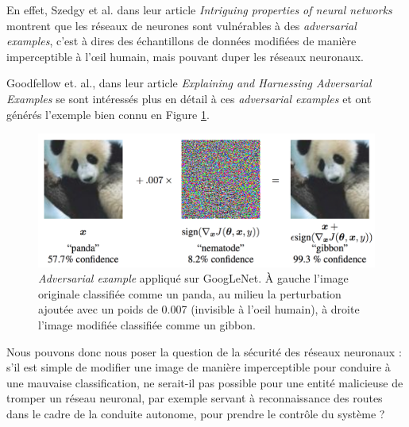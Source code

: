 \documentclass[10pt,twocolumn,letterpaper]{article}
\begin{document}
En effet, Szedgy et al. dans leur article \textit{Intriguing properties of neural networks} \cite{szegedy2013intriguing} montrent que les réseaux de neurones sont vulnérables à des \textit{adversarial examples}, c'est à dires des échantillons de données modifiées de manière imperceptible à l'œil humain, mais pouvant duper les réseaux neuronaux.

Goodfellow et. al., dans leur article \textit{Explaining and Harnessing Adversarial Examples} \cite{goodfellow2014explaining} se sont intéressés plus en détail à ces \textit{adversarial examples} et ont générés l'exemple bien connu en Figure \ref{fig:goodfellow_panda}.




\begin{figure}[ht]
\begin{center}
\includegraphics[width=0.8\linewidth]{ressources/goodfellow_panda.png}
\end{center}
   \caption{\textit{Adversarial example} appliqué sur GoogLeNet. À gauche l'image originale classifiée comme un panda, au milieu la perturbation ajoutée avec un poids de 0.007 (invisible à l'oeil humain), à droite l'image modifiée classifiée comme un gibbon.}
\label{fig:goodfellow_panda}
\end{figure}


Nous pouvons donc nous poser la question de la sécurité des réseaux neuronaux : s'il est simple de modifier une image de manière imperceptible pour conduire à une mauvaise classification, ne serait-il pas possible pour une entité malicieuse de tromper un réseau neuronal, par exemple servant à reconnaissance des routes dans le cadre de la conduite autonome, pour prendre le contrôle du système ?
\end{document}
